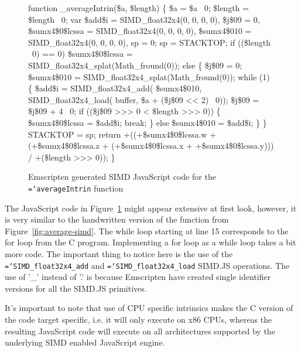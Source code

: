 \documentclass[preprint]{sigplanconf}
\newcommand{\ttt}[1]{{\texttt{\hyphenchar\font=`\-\relax #1}}}%
\begin{document}
\begin{figure}
\begin{small}
\begin{program}[style=tt, number=true]
fu\tab{}nction \_averageIntrin(\$a, \$length) \{
  \$a = \$a \textbar\ 0;
  \$length = \$length \textbar\ 0;
  var \tab{}\$add\$i = SIMD\_float32x4(0, 0, 0, 0),
      \$j\$09 = 0,
      \$sumx4\$0\$lcssa = SIMD\_float32x4(0, 0, 0, 0),
      \$sumx4\$010 = SIMD\_float32x4(0, 0, 0, 0),
      sp = 0;\untab{}
  sp = STACKTOP;
  if\tab{} ((\$length \textbar\ 0) == 0)
    \$sumx4\$0\$lcssa = SIMD\_float32x4\_splat(Math\_fround(0));\untab{}
  el\tab{}se \{
    \$j\$09 = 0;
    \$sumx4\$010 = SIMD\_float32x4\_splat(Math\_fround(0));
    whi\tab{}le (1) \{
      \$a\tab{}dd\$i =
        SI\tab{}MD\_float32x4\_add(
          \$sumx4\$010,
          SIMD\_float32x4\_load(
            buffer, \$a + (\$j\$09 << 2) \textbar\ 0));\untab{}\untab{}
      \$j\$09 = \$j\$09 + 4 \textbar\ 0;
      if\tab{} (\!(\$j\$09 >>> 0 < \$length >>> 0)) \{
        \$sumx4\$0\$lcssa = \$add\$i;
        break;\untab{}
      \} else \$sumx4\$010 = \$add\$i;\untab{}
    \}\untab{}
  \}
  STACKTOP = sp;
  return\tab{} +((+\$sumx4\$0\$lcssa.w + (+\$sumx4\$0\$lcssa.z +
        (+\$sumx4\$0\$lcssa.x + +\$sumx4\$0\$lcssa.y))) /
        +(\$length >>> 0));\untab{}\untab{}
\}
\end{program}
\end{small}
\caption{Emscripten generated SIMD JavaScript code for the \ttt{averageIntrin} function}
\label{fig:average-intrin-js}
\end{figure}

The JavaScript code in Figure~\ref{fig:average-intrin-js} might appear
extensive at first look, however, it is very similar to the handwritten
version of the function from Figure~\ref{fig:average-simd}.  The while loop
starting at line 15 corresponds to the for loop from the C program.  Implementing
a for loop as a while loop takes a bit more code.  The important thing to notice
here is the use of the \ttt{SIMD\_float32x4\_add} and \ttt{SIMD\_float32x4\_load}
SIMD.JS operations.  The use of '\_' instead of '.' is because Emscripten have
created single identifier versions for all the SIMD.JS primitives.

It's important to note that use of CPU specific intrinsics makes the C version
of the code target specific, i.e. it will only execute on x86 CPUs, whereas the
resulting JavaScript code will execute on all architectures supported by the
underlying SIMD enabled JavaScript engine.
\end{document}
